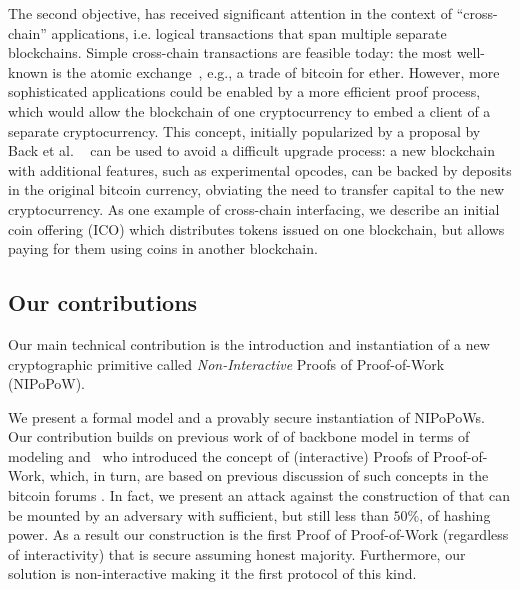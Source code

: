 %
The second objective, has received  significant attention in the context of
``cross-chain'' applications, i.e. logical transactions that span multiple
separate blockchains. Simple cross-chain transactions are feasible today: the
most well-known is the atomic exchange~\cite{tiernolan}, e.g., a trade of
bitcoin for ether. However, more sophisticated applications could be enabled by
a more efficient proof process, which would allow the blockchain of one
cryptocurrency to embed a client of a separate cryptocurrency. This concept,
initially popularized by a proposal by Back et al. ~\cite{sidechains} can be
used to avoid a difficult upgrade process: a new blockchain with additional
features, such as experimental opcodes, can be backed by deposits in the
original bitcoin currency, obviating the need to transfer capital to the new
cryptocurrency. As one example of cross-chain interfacing, we describe an
initial coin offering (ICO) which distributes tokens issued on one blockchain,
but allows paying for them using coins in another blockchain.


\subsection{Our contributions}
Our main technical contribution is the introduction and instantiation of a new
cryptographic primitive called \textit{Non-Interactive} Proofs of Proof-of-Work
(NIPoPoW).

We present a formal model and a provably secure instantiation of NIPoPoWs. Our contribution builds on previous work  of 
of
backbone model \cite{backbone} in terms of modeling and~\cite{KLS} who introduced the concept of (interactive) Proofs of Proof-of-Work,
which, in turn, are based on previous discussion of such concepts in the bitcoin
forums \cite{highway}. In fact, we present an attack against the
construction of \cite{KLS} that can be mounted by an adversary with sufficient, but still less than $50\%$, of hashing power. 
As a result  our construction is the first Proof
of Proof-of-Work (regardless of interactivity) that is secure assuming honest majority.
Furthermore, our solution is non-interactive making it the first protocol
of this kind. 

